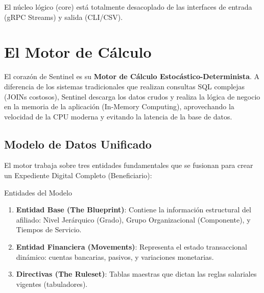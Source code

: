 
El núcleo lógico (core) está totalmente desacoplado de las interfaces de entrada (gRPC Streams) y salida (CLI/CSV).

\section{El Motor de Cálculo}

El corazón de Sentinel es su \textbf{Motor de Cálculo Estocástico-Determinista}. A diferencia de los sistemas tradicionales que realizan consultas SQL complejas (JOINs costosos), Sentinel descarga los datos crudos y realiza la lógica de negocio en la memoria de la aplicación (In-Memory Computing), aprovechando la velocidad de la CPU moderna y evitando la latencia de la base de datos.


\subsection{Modelo de Datos Unificado}

El motor trabaja sobre tres entidades fundamentales que se fusionan para crear un Expediente Digital Completo (Beneficiario):

\begin{caja}{Entidades del Modelo}
\begin{enumerate}
\item \textbf{Entidad Base (The Blueprint)}: Contiene la información estructural del afiliado: Nivel Jerárquico (Grado), Grupo Organizacional (Componente), y Tiempos de Servicio.
\item \textbf{Entidad Financiera (Movements)}: Representa el estado transaccional dinámico: cuentas bancarias, pasivos, y variaciones monetarias.
\item \textbf{Directivas (The Ruleset)}: Tablas maestras que dictan las reglas salariales vigentes (tabuladores).
\end{enumerate}
\end{caja}


